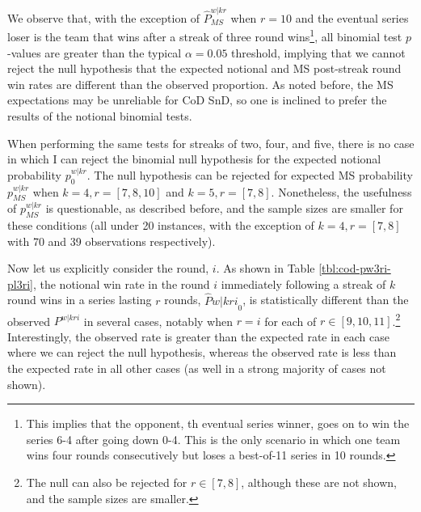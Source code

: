 \documentclass{article}
\begin{document}
We observe that, with the exception of \(\hat{P}^{w|kr}_{MS}\) when
\(r = 10\) and the eventual series loser is the team that wins after a
streak of three round wins\footnote{This implies that the opponent, th
  eventual series winner, goes on to win the series 6-4 after going down
  0-4. This is the only scenario in which one team wins four rounds
  consecutively but loses a best-of-11 series in 10 rounds.}, all
binomial test \(p\)-values are greater than the typical
\(\alpha = 0.05\) threshold, implying that we cannot reject the null
hypothesis that the expected notional and MS post-streak round win rates
are different than the observed proportion. As noted before, the MS
expectations may be unreliable for CoD SnD, so one is inclined to prefer
the results of the notional binomial tests.

When performing the same tests for streaks of two, four, and five, there
is no case in which I can reject the binomial null hypothesis for the
expected notional probability \(p^{w|kr}_0\). The null hypothesis can be
rejected for expected MS probability \(p^{w|kr}_{MS}\) when
\(k = 4, r = [7, 8, 10]\) and \(k = 5, r = [7, 8]\). Nonetheless, the
usefulness of \(p^{w|kr}_{MS}\) is questionable, as described before,
and the sample sizes are smaller for these conditions (all under 20
instances, with the exception of \(k = 4, r = [7, 8]\) with 70 and 39
observations respectively).

Now let us explicitly consider the round, \(i\). As shown in Table
\ref{tbl:cod-pw3ri-pl3ri}, the notional win rate in the round \(i\)
immediately following a streak of \(k\) round wins in a series lasting
\(r\) rounds, \(\hat{P}{w|kri}_0\), is statistically different than the
observed \(P^{w|kri}\) in several cases, notably when \(r = i\) for each
of \(r \in [9, 10, 11]\).\footnote{The null can also be rejected for
  \(r \in [7, 8]\), although these are not shown, and the sample sizes
  are smaller.} Interestingly, the observed rate is greater than the
expected rate in each case where we can reject the null hypothesis,
whereas the observed rate is less than the expected rate in all other
cases (as well in a strong majority of cases not shown).
\end{document}
